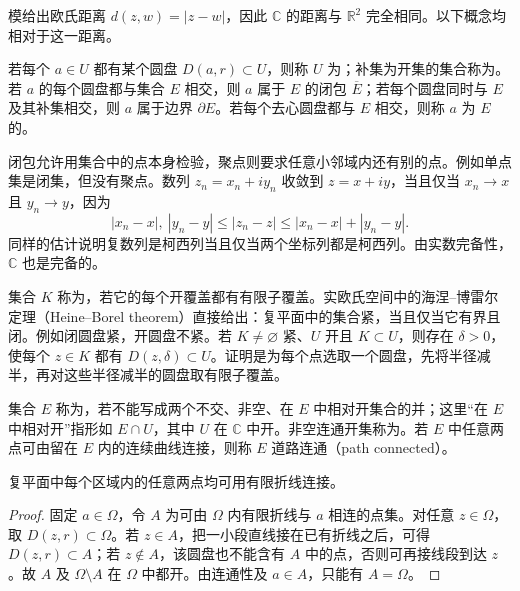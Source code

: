 \documentclass[UTF8,12pt,a4paper,fontset=fandol]{ctexbook}
\begin{document}
模给出欧氏距离 $d(z,w)=|z-w|$，因此 $\mathbb{C}$ 的距离与 $\mathbb{R}^2$ 完全相同。以下概念均相对于这一距离。

\begin{definition}[开集、闭集与边界]
若每个 $a\in U$ 都有某个圆盘 $D(a,r)\subset U$，则称 $U$ 为；补集为开集的集合称为。若 $a$ 的每个圆盘都与集合 $E$ 相交，则 $a$ 属于 $E$ 的闭包 $\overline E$；若每个圆盘同时与 $E$ 及其补集相交，则 $a$ 属于边界 $\partial E$。若每个去心圆盘都与 $E$ 相交，则称 $a$ 为 $E$ 的。
\end{definition}

闭包允许用集合中的点本身检验，聚点则要求任意小邻域内还有别的点。例如单点集是闭集，但没有聚点。数列 $z_n=x_n+iy_n$ 收敛到 $z=x+iy$，当且仅当 $x_n\to x$ 且 $y_n\to y$，因为
\[
 |x_n-x|,\ |y_n-y|\le|z_n-z|\le|x_n-x|+|y_n-y|.
\]
同样的估计说明复数列是柯西列当且仅当两个坐标列都是柯西列。由实数完备性，$\mathbb{C}$ 也是完备的。

集合 $K$ 称为，若它的每个开覆盖都有有限子覆盖。实欧氏空间中的海涅--博雷尔定理（Heine--Borel theorem）直接给出：复平面中的集合紧，当且仅当它有界且闭。例如闭圆盘紧，开圆盘不紧。若 $K\ne\varnothing$ 紧、$U$ 开且 $K\subset U$，则存在 $\delta>0$，使每个 $z\in K$ 都有 $D(z,\delta)\subset U$。证明是为每个点选取一个圆盘，先将半径减半，再对这些半径减半的圆盘取有限子覆盖。

\begin{definition}[连通与区域]
集合 $E$ 称为，若不能写成两个不交、非空、在 $E$ 中相对开集合的并；这里“在 $E$ 中相对开”指形如 $E\cap U$，其中 $U$ 在 $\mathbb{C}$ 中开。非空连通开集称为。若 $E$ 中任意两点可由留在 $E$ 内的连续曲线连接，则称 $E$ 道路连通（path connected）。
\end{definition}

\begin{proposition}
\label{prop:ca-polygonal-connected}
复平面中每个区域内的任意两点均可用有限折线连接。
\end{proposition}
\begin{proof}
固定 $a\in\Omega$，令 $A$ 为可由 $\Omega$ 内有限折线与 $a$ 相连的点集。对任意 $z\in\Omega$，取 $D(z,r)\subset\Omega$。若 $z\in A$，把一小段直线接在已有折线之后，可得 $D(z,r)\subset A$；若 $z\notin A$，该圆盘也不能含有 $A$ 中的点，否则可再接线段到达 $z$。故 $A$ 及 $\Omega\setminus A$ 在 $\Omega$ 中都开。由连通性及 $a\in A$，只能有 $A=\Omega$。
\end{proof}
\end{document}
